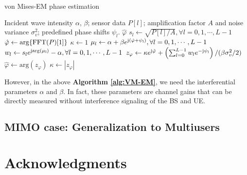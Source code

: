 \documentclass[12pt,draftclsnofoot,journal,onecolumn]{IEEEtran}
\theoremstyle{nonumberplain}
\def \arg {\text{arg}}
\def \j  {\rm {j}}
\begin{document}
    \begin{algorithm}[H] 
        \caption{von Mises-EM phase estimation} \label{alg:VM-EM}
        \begin{algorithmic}[1]
            \REQUIRE Incident wave intensity $\alpha$, $\beta$; sensor data $P[l]$; amplification factor $A$ and noise variance $\sigma_v^2$; predefined phase shifts $\psi_l$.
            \ENSURE $\hat{\varphi}$
            \STATE $s_l \leftarrow \sqrt{P[l]/A}, \forall l=0,1,\cdots,L-1$
            \STATE $\hat{\varphi} \leftarrow \arg\{{\rm FFT}(P)[1]\}$
            \STATE $\kappa \leftarrow 1$
                \STATE $\mu_l \leftarrow \alpha + \beta e^{\j (\hat{\varphi}+\psi_l)}, \forall l=0,1,\cdots,L-1$
                \STATE $w_l \leftarrow s_l e^{\j \arg(\mu_l)} - \alpha, \forall l=0,1,\cdots,L-1$
                \STATE $z_\varphi \leftarrow \kappa e^{\j \hat{\varphi}} + \left( \sum_{l=0}^{L-1}{w_l e^{-\j \psi_l}}\right) / (\beta \sigma_v^2/2)$
                \STATE $\hat{\varphi} \leftarrow \arg(z_\varphi)$
                \STATE $\kappa \leftarrow |z_\varphi|$
            \ENDWHILE
        \end{algorithmic}
    \end{algorithm}

    However, in the above {\bf Algorithm \ref{alg:VM-EM}}, we need the interferential parameters $\alpha$ and $\beta$. In fact, these parameters are channel gains that can be directly measured without interference signaling of the BS and UE. 

\subsection{MIMO case: Generalization to Multiusers}

\appendices


\section*{Acknowledgments}
\end{document}
